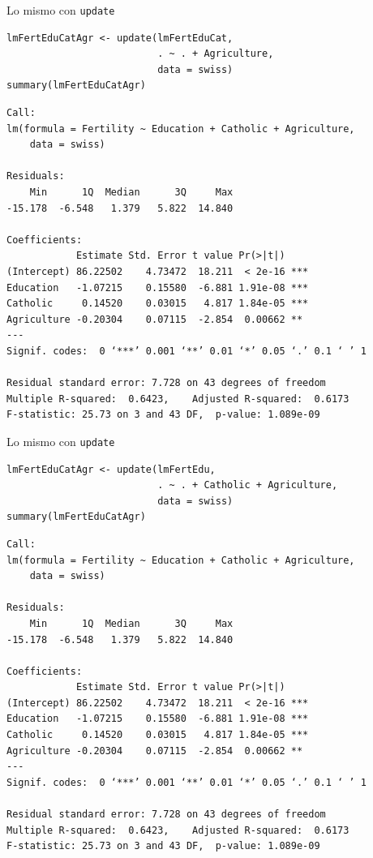 \documentclass[xcolor={usenames,svgnames,dvipsnames}]{beamer}
\begin{document}
\begin{frame}[fragile,label=sec-5-8]{Lo mismo con \texttt{update}}
 \lstset{language=R,label= ,caption= ,numbers=none}
\begin{lstlisting}
lmFertEduCatAgr <- update(lmFertEduCat,
                          . ~ . + Agriculture,
                          data = swiss)
summary(lmFertEduCatAgr)
\end{lstlisting}

\begin{verbatim}
Call:
lm(formula = Fertility ~ Education + Catholic + Agriculture, 
    data = swiss)

Residuals:
    Min      1Q  Median      3Q     Max 
-15.178  -6.548   1.379   5.822  14.840 

Coefficients:
            Estimate Std. Error t value Pr(>|t|)    
(Intercept) 86.22502    4.73472  18.211  < 2e-16 ***
Education   -1.07215    0.15580  -6.881 1.91e-08 ***
Catholic     0.14520    0.03015   4.817 1.84e-05 ***
Agriculture -0.20304    0.07115  -2.854  0.00662 ** 
---
Signif. codes:  0 ‘***’ 0.001 ‘**’ 0.01 ‘*’ 0.05 ‘.’ 0.1 ‘ ’ 1

Residual standard error: 7.728 on 43 degrees of freedom
Multiple R-squared:  0.6423,	Adjusted R-squared:  0.6173 
F-statistic: 25.73 on 3 and 43 DF,  p-value: 1.089e-09
\end{verbatim}
\end{frame}

\begin{frame}[fragile,label=sec-5-9]{Lo mismo con \texttt{update}}
 \lstset{language=R,label= ,caption= ,numbers=none}
\begin{lstlisting}
lmFertEduCatAgr <- update(lmFertEdu,
                          . ~ . + Catholic + Agriculture,
                          data = swiss)
summary(lmFertEduCatAgr)
\end{lstlisting}

\begin{verbatim}
Call:
lm(formula = Fertility ~ Education + Catholic + Agriculture, 
    data = swiss)

Residuals:
    Min      1Q  Median      3Q     Max 
-15.178  -6.548   1.379   5.822  14.840 

Coefficients:
            Estimate Std. Error t value Pr(>|t|)    
(Intercept) 86.22502    4.73472  18.211  < 2e-16 ***
Education   -1.07215    0.15580  -6.881 1.91e-08 ***
Catholic     0.14520    0.03015   4.817 1.84e-05 ***
Agriculture -0.20304    0.07115  -2.854  0.00662 ** 
---
Signif. codes:  0 ‘***’ 0.001 ‘**’ 0.01 ‘*’ 0.05 ‘.’ 0.1 ‘ ’ 1

Residual standard error: 7.728 on 43 degrees of freedom
Multiple R-squared:  0.6423,	Adjusted R-squared:  0.6173 
F-statistic: 25.73 on 3 and 43 DF,  p-value: 1.089e-09
\end{verbatim}
\end{frame}
\end{document}
